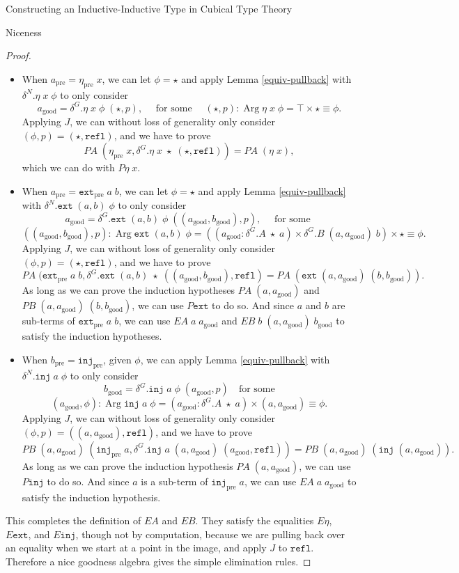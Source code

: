 \documentclass[runningheads]{llncs}
\DeclareMathOperator{\Arg}{Arg}
\newcommand{\pre}[1]{{#1}_\text{pre}}
\newcommand{\good}[1]{{#1}_\text{good}}
\newcommand{\Id}[2]{{#1}\equiv{#2}}
\newcommand{\join}{\texttt{ext}}
\newcommand{\inj}{\texttt{inj}}
\newcommand{\refl}{\texttt{refl}}
\newcommand{\PA}{\mathit{PA}}
\newcommand{\PB}{\mathit{PB}}
\newcommand{\EA}{\mathit{EA}}
\newcommand{\EB}{\mathit{EB}}
\begin{document}
\begin{section}{Constructing an Inductive-Inductive Type in Cubical Type Theory}
\begin{subsection}{Niceness}
\begin{proof}
{\begin{itemize}
\item When $\pre{a} = \pre{\eta}\;x$, we can let $\phi = \star$ and apply Lemma \ref{equiv-pullback} with $\delta^N.\eta\;x\;\phi$ to only consider \[\good{a} = \delta^G.\eta\;x\;\phi\;(\star, p),\quad\text{ for some }\quad(\star, p) : \Arg\eta\;x\;\phi = \top \times \Id{\star}{\phi}.\] Applying $J$, we can without loss of generality only consider $(\phi, p) = (\star, \refl)$, and we have to prove \[\PA\;(\pre{\eta}\;x, \delta^G.\eta\;x\;\star\;(\star, \refl)) = \PA\;(\eta\;x),\] which we can do with $P\eta\;x$.
\item When $\pre{a} = \pre{\join}\;a\;b$, we can let $\phi = \star$ and apply Lemma \ref{equiv-pullback} with $\delta^N.\join\;(a, b)\;\phi$ to only consider \[\good{a} = \delta^G.\join\;(a,b)\;\phi\;((\good{a}, \good{b}), p),\quad\text{ for some }\]\[((\good{a}, \good{b}), p) : \Arg\join\;(a, b)\;\phi = ((\good{a} : \delta^G.A\;\star\;a) \times \delta^G.B\;(a, \good{a})\;b) \times \Id{\star}{\phi}.\] Applying $J$, we can without loss of generality only consider $(\phi, p) = (\star, \refl)$, and we have to prove \[\PA\;(\pre{\join}\;a\;b, \delta^G.\join\;(a, b)\;\star\;((\good{a}, \good{b}),\refl) = \PA\;(\join\;(a, \good{a})\;(b, \good{b})).\] As long as we can prove the induction hypotheses $\PA\;(a, \good{a})$ and $\PB\;(a, \good{a})\;(b, \good{b})$, we can use $P\join$ to do so. And since $a$ and $b$ are sub-terms of $\pre{\join}\;a\;b$, we can use $\EA\;a\;\good{a}$ and $\EB\;b\;(a, \good{a})\;\good{b}$ to satisfy the induction hypotheses.
\item When $\pre{b} = \pre{\inj}$, given $\phi$, we can apply Lemma \ref{equiv-pullback} with $\delta^N.\inj\;a\;\phi$ to only consider \[\good{b} = \delta^G.\inj\;a\;\phi\;(\good{a}, p)\quad\text{for some}\]\[(\good{a}, \phi) : \Arg\inj\;a\;\phi = (\good{a} : \delta^G.A\;\star\;a) \times \Id{(a, \good{a})}{\phi}.\] Applying $J$, we can without loss of generality only consider $(\phi, p) = ((a, \good{a}), \refl)$, and we have to prove \[\PB\;(a, \good{a})\;(\pre{\inj}\;a, \delta^G.\inj\;a\;(a, \good{a})\;(\good{a}, \refl)) = \PB\;(a, \good{a})\;(\inj\;(a, \good{a})).\] As long as we can prove the induction hypothesis $\PA\;(a, \good{a})$, we can use $P\inj$ to do so. And since $a$ is a sub-term of $\pre{\inj}\;a$, we can use $\EA\;a\;\good{a}$ to satisfy the induction hypothesis.
\end{itemize}
This completes the definition of $\EA$ and $\EB$. They satisfy the equalities $E\eta$, $E\join$, and $E\inj$, though not by computation, because we are pulling back over an equality when we start at a point in the image, and apply $J$ to $\refl$. Therefore a nice goodness algebra gives the simple elimination rules.
}


\end{proof}
\end{subsection}
\end{section}
\end{document}
